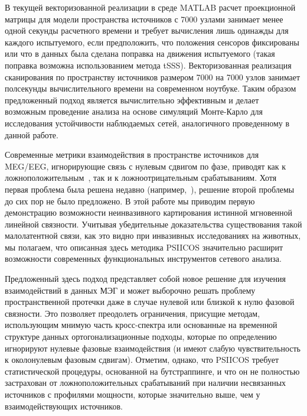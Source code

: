 В текущей векторизованной реализации в среде MATLAB расчет проекционной матрицы
для модели пространства источников с 7000 узлами занимает менее одной секунды
расчетного времени и требует вычисления лишь одинажды для каждого испытуемого,
если предположить, что положения сенсоров фиксированы или что в данных была
сделана поправка на движения испытуемого (такая поправка возможна
использованием метода tSSS).  Векторизованная реализация сканирования по
пространству источников размером 7000 на 7000 узлов занимает полсекунды
вычислительного времени на современном ноутбуке.  Таким образом предложенный
подход является вычислительно эффективным и делает возможным проведение анализа
на основе симуляций Монте-Карло для исследования устойчивости наблюдаемых
сетей, аналогичного проведенному в данной работе.

Современные метрики взаимодействия в пространстве источников для MEG/EEG,
игнорирующие связь с нулевым сдвигом по фазе, приводят как к ложноположительным~\cite{Palva2018}, так и к ложноотрицательным срабатываниям. Хотя первая проблема была
решена недавно (например,~\cite{Wang2018}), решение второй проблемы до сих
пор не было предложено. В этой работе мы приводим первую демонстрацию
возможности неинвазивного картирования истинной мгновенной линейной связности.
Учитывая убедительные доказательства существования такой малолатентной связи,
как это видно при инвазивных исследованиях на животных, мы полагаем, что
описанная здесь методика PSIICOS значительно расширит возможности современных
функциональных инструментов сетевого анализа.


Предложенный здесь подход представляет собой новое решение для изучения
взаимодействий в данных МЭГ и может выборочно решать проблему пространственной
протечки даже в случае нулевой или близкой к нулю фазовой связности. Это
позволяет преодолеть ограничения, присущие методам, использующим мнимую часть
кросс-спектра или основанные на временной структуре данных ортогонализационные
подходы, которые по определению игнорируют нулевые фазовые взаимодействия (и
имеют слабую чувствительность к околонулевым фазовым сдвигам). Отметим, однако,
что PSIICOS требует статистической процедуры, основанной на бутстраппинге, и
что он не полностью застрахован от ложноположительных срабатываний при наличии
несвязанных источников с профилями мощности, которые значительно выше, чем у
взаимодействующих источников.

